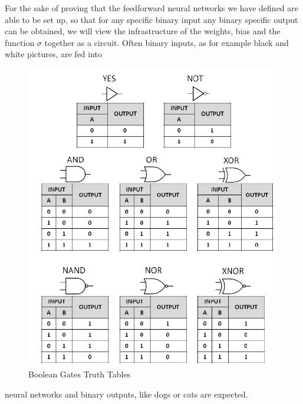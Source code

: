 \documentclass{article}
\theoremstyle{definition}
\newcommand*{\figuretitle}[1]{%
    {\centering%
    \textbf{#1}%
    \par\medskip}%
}
\begin{document}
For the sake of proving that the feedforward neural networks we have defined are able to be set up, so that for any specific binary input any binary specific output can be obtained, we will view the infrastructure of the weights, bias and the function $\sigma$ together as a circuit. Often binary inputs, as for example black and white pictures, are fed into 
\begin{figure}
\centering
\includegraphics[scale=0.2]{graphics/Summary-of-the-common-Boolean-logic-gates-with-symbols-and-truth-tables.png}
\caption{Boolean Gates Truth Tables \cite{booleanGates}}
\label{fig:bool_gate}
\end{figure}
neural networks and binary outputs, like dogs or cats are expected.
\end{document}
